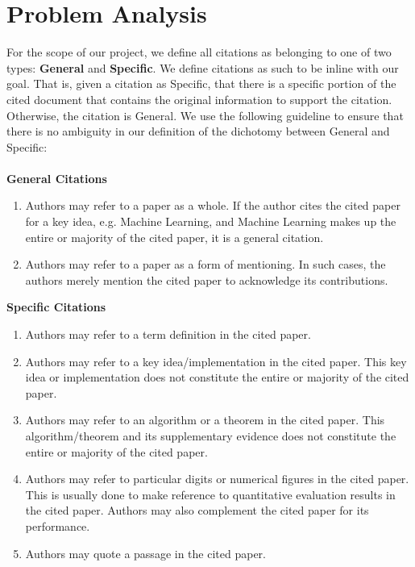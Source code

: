 \chapter{Problem Analysis}
\label{problemanalysis}

For the scope of our project, we define all citations as belonging to one of two types: \textbf{General} and \textbf{Specific}. 
We define citations as such to be inline with our goal. That is, given a citation as Specific, that there is a specific portion of the cited document that contains the original information to support the citation. Otherwise, the citation is General. We use the following guideline to ensure that there is no ambiguity in our definition of the dichotomy between General and Specific: \\ \\
\textbf{General Citations}
\begin{enumerate}
\item Authors may refer to a paper as a whole. If the author cites the cited paper for a key idea, e.g. Machine Learning, and Machine Learning makes up the entire or majority of the cited paper, it is a general citation.
\item Authors may refer to a paper as a form of mentioning. In such cases, the authors merely mention the cited paper to acknowledge its contributions.
\end{enumerate}
\textbf{Specific Citations}
\begin{enumerate}
\item Authors may refer to a term definition in the cited paper.
\item Authors may refer to a key idea/implementation in the cited paper. This key idea or implementation does not constitute the entire or majority of the cited paper.
\item Authors may refer to an algorithm or a theorem in the cited paper. This algorithm/theorem and its supplementary evidence does not constitute the entire or majority of the cited paper.
\item Authors may refer to particular digits or numerical figures in the cited paper. This is usually done to make reference to quantitative evaluation results in the cited paper. Authors may also complement the cited paper for its performance.
\item Authors may quote a passage in the cited paper.
\end{enumerate}

